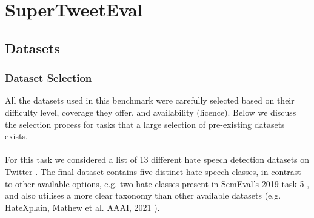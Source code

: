 \begin{table}[ht]
\centering
{}
\caption{Best hyper-parameters for models trained on the combined datasets for the binary and multiclass settings.}
\label{tab:hyperparameters}
\end{table}


\section{SuperTweetEval}

\subsection{Datasets}
\label{appendix:SuperTweetEval}
\subsubsection{Dataset Selection}
\label{appendix:SuperTweetEval-data_selection}
All the datasets used in this benchmark were carefully selected based on their difficulty level, coverage they offer, and availability (licence). Below we discuss the selection process for tasks that a large selection of pre-existing datasets exists.
 
 \paragraph{{\TweetHate}} For this task we considered a list of 13 different hate speech detection datasets on Twitter \cite{sachdeva-etal-2022-measuring,samory2021call,grimminger-klinger-2021-hate,mathew2021hatexplain,zampieri2019predicting,davidson2017automated,Talat2016HatefulSO,waseem-2016-racist,ousidhoum-etal-2019-multilingual,basile2019semeval,mandl2019overview,vidgen-etal-2020-detecting,founta2018large}. The final dataset contains five distinct hate-speech classes, in contrast to other available options, e.g. two hate classes present in SemEval's 2019 task 5 \cite{basile2019semeval}, and also utilises a more clear taxonomy than other available datasets (e.g. HateXplain, Mathew et al. AAAI, 2021 \cite{mathew2021hatexplain}).

